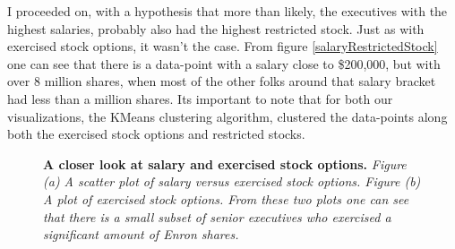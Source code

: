\documentclass[titlepage,numbers=noenddot,headinclude,%
               footinclude=true,abstractoff,BCOR=5mm,%
               paper=a4,fontsize=11pt,ngerman,american]{scrreprt}
\numberwithin{theorem}{chapter}
\numberwithin{definition}{chapter}
\numberwithin{algorithm}{chapter}
\numberwithin{figure}{chapter}
\numberwithin{table}{chapter}
\numberwithin{equation}{chapter}
\begin{document}
I proceeded on, with a hypothesis that more than likely, the executives with the highest salaries, probably also had the highest restricted stock. Just as with exercised stock options, it wasn't the case. From figure \ref{salaryRestrictedStock} one can see that there is a data-point with a salary close to \$200,000, but with over 8 million shares, when most of the other folks around that salary bracket had less than a million shares. Its important to note that for both our visualizations, the KMeans clustering algorithm, clustered the data-points along both the exercised stock options and restricted stocks.
\begin{figure}[!hbtp]
\centering

    \caption{\textbf{A closer look at salary and exercised stock options.} \textit{Figure (a) A scatter plot of salary versus exercised stock options. Figure (b) A plot of exercised stock options. From these two plots one can see that there is a small subset of senior executives who exercised a significant amount of Enron shares. }}
\end{figure}
\end{document}
